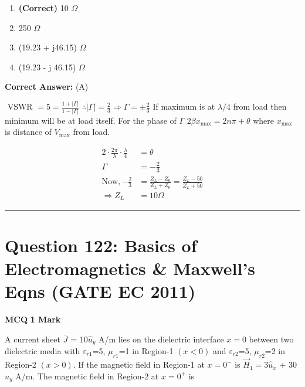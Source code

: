 \documentclass[11pt,a4paper]{article}
\begin{document}
\begin{enumerate}[label=(\Alph*)]
    \item \textbf{(Correct)} 10 $\Omega$
    \item 250 $\Omega$
    \item (19.23 + j46.15) $\Omega$
    \item (19.23 - j 46.15) $\Omega$
\end{enumerate}

\noindent \textbf{Correct Answer:} (A)

\begin{tcolorbox}[solbox, title=Detailed Solution -- Question 121]
$\text { VSWR }=5=\frac{1+|\Gamma|}{1-|\Gamma|}$
$\therefore |\Gamma|=\frac{2}{3} \Rightarrow \Gamma=\pm \frac{2}{3}$
 If maximum is at $\lambda / 4$ from load then minimum will be at load itself.
 For the phase of $\Gamma$
$2 \beta x_{\max }=2 n \pi+\theta$
 where $x_{\max }$ is distance of $V_{\max }$ from load.

\[
\begin{aligned} 2 \cdot \frac{2 \pi}{\lambda} \cdot \frac{\lambda}{4}&=\theta \\ \Gamma&=-\frac{2}{3}\\ \text{Now},-\frac{2}{3}&=\frac{Z_{L}-Z_{0}}{Z_{L}+Z_{0}}=\frac{Z_{L}-50}{Z_{L}+50}\\ \Rightarrow Z_{L}&=10 \Omega \end{aligned}
\]
\end{tcolorbox}

\vspace{1.5em}
\hrule
\vspace{1.5em}

\section*{Question 122: Basics of Electromagnetics \& Maxwell's Eqns (GATE EC 2011)}
\noindent \textbf{\color{primary}MCQ} \hfill \textbf{\color{secondary}1 Mark}


\noindent A current sheet $\bar{J}$ = 10$\hat{u}_{y}$ A/m lies on the dielectric interface $x=0$ between two dielectric media with $\varepsilon _{r1}$=5, $\mu _{r1}$=1 in Region-1 $(x < 0)$ and $\varepsilon _{r2}$=5, $\mu _{r2}$=2 in Region-2 $(x > 0)$. If the magnetic field in Region-1 at $x = 0^{-}$ is $\vec{H}_{1} = 3\hat{u}_{x}$ + 30$\hat{u}_{y}$ A/m. The magnetic field in Region-2 at $x = 0^{+}$ is  
\end{document}

